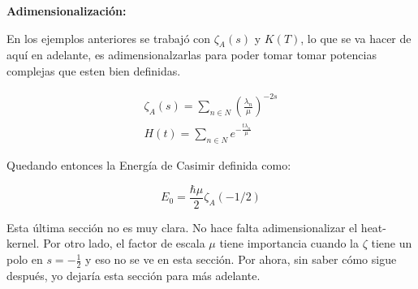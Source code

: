 \bigskip

{\magenta \textbf{Adimensionalización:}

\medskip

En los ejemplos anteriores se trabajó con  $\zeta _A (s) $ y $K(T)$, lo que se va hacer de aquí en adelante, es adimensionalzarlas para poder tomar tomar potencias complejas que esten bien definidas.


\begin{equation}
\begin{array}{c}


\zeta _A (s) = \sum _{n \in N} \left( \frac{\lambda _n}{\mu }  \right) ^{-2s } \\[10pt]

H (t)  = \sum \limits_{n \in N} e ^{- \frac{t \lambda _{n}}{\mu} }

\end{array}
\end{equation}

Quedando entonces la Energía de Casimir definida como:

\begin{equation}
E _0 = \frac{\hbar \mu}{2} \zeta _A (-1/2)
\end{equation}}

{\red Esta última sección no es muy clara. No hace falta adimensionalizar el heat-kernel. Por otro lado, el factor de escala $\mu$ tiene importancia cuando la $\zeta$ tiene un polo en $s=-\frac12$ y eso no se ve en esta sección. Por ahora, sin saber cómo sigue después, yo dejaría esta sección para más adelante.}
